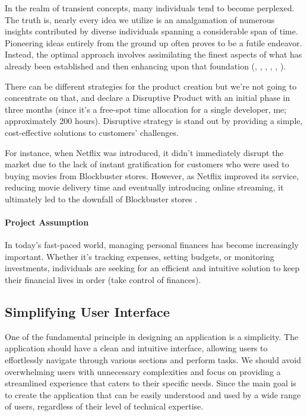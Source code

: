 
In the realm of transient concepts, many individuals tend to become perplexed. The truth is, nearly every idea we 
utilize is an amalgamation of numerous insights contributed by diverse individuals spanning a considerable span of 
time. Pioneering ideas entirely from the ground up often proves to be a futile endeavor. Instead, the optimal approach 
involves assimilating the finest aspects of what has already been established and then enhancing upon that foundation
(\cite{John11}, \cite{Azar22}, \cite{Page19}, \cite{Bara18}, \cite{Kleo12}, \cite{Thag12}).

There can be different strategies for the product creation \cite{Lomb17} but we're not going to concentrate on that,
and declare a Disruptive Product with an initial phase in three months (since it's a free-spot time allocation
for a single developer, me; approximately 200 hours). Disruptive strategy is stand out by providing a simple, 
cost-effective solutions to customers' challenges. 

For instance, when Netflix was introduced, it didn't immediately disrupt the market due to the lack of instant 
gratification for customers who were used to buying movies from Blockbuster stores. However, as Netflix 
improved its service, reducing movie delivery time and eventually introducing online streaming, it ultimately led 
to the downfall of Blockbuster stores \cite{Eby17}.

\paragraph{Project Assumption} In today's fast-paced world, managing personal finances has become increasingly 
important. Whether it's tracking expenses, setting budgets, or monitoring investments, individuals are seeking for an 
efficient and intuitive solution to keep their financial lives in order (take control of finances).


\subsection{Simplifying User Interface}

One of the fundamental principle in designing an application is a simplicity. The application should have a clean and 
intuitive interface, allowing users to effortlessly navigate through various sections and perform tasks. We should avoid 
overwhelming users with unnecessary complexities and focus on providing a streamlined experience that caters to 
their specific needs. Since the main goal is to create the application that can be easily understood and used by a wide 
range of users, regardless of their level of technical expertise.

